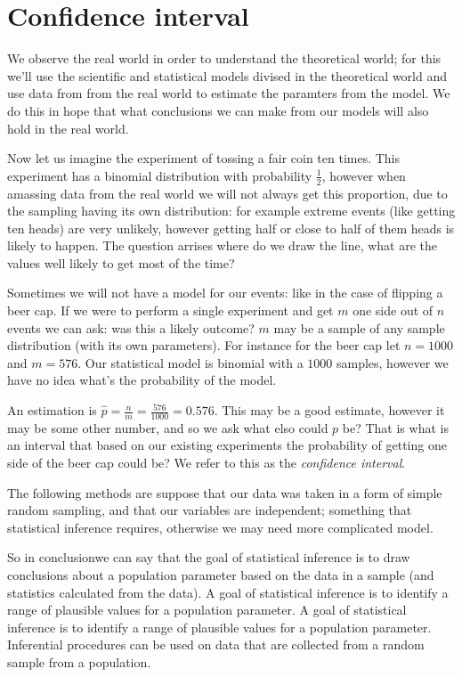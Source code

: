 \chapter*{Confidence interval}

\setcounter{section}{0}
\renewcommand*{\theHsection}{ch4.\the\value{section}}

We observe the real world in order to understand the theoretical world; for this
we'll use the scientific and statistical models divised in the theoretical world
and use data from from the real world to estimate the paramters from the model.
We do this in hope that what conclusions we can make from our models will also
hold in the real world.


Now let us imagine the experiment of tossing a fair coin ten times. This
experiment has a binomial distribution with probability $\frac{1}{2}$, however
when amassing data from the real world we will not always get this proportion,
due to the sampling having its own distribution: for example extreme events
(like getting ten heads) are very unlikely, however getting half or close to
half of them heads is likely to happen. The question arrises where do we draw
the line, what are the values well likely to get most of the time?

Sometimes we will not have a model for our events: like in the case of flipping
a beer cap. If we were to perform a single experiment and get $m$ one side
out of $n$ events we can ask: was this a likely outcome? $m$ may be a sample of
any sample distribution (with its own parameters). For instance for the beer cap
let $n=1000$ and $m=576$. Our statistical model is binomial with a $1000$
samples, however we have no idea what's the probability of the model.

An estimation is $\hat{p}=\frac{n}{m}=\frac{576}{1000}=0.576$. This may be a
good estimate, however it may be some other number, and so we ask what elso
could $p$ be? That is what is an interval that based on our existing experiments
the probability of getting one side of the beer cap could be? We refer to this
as the \emph{confidence interval}.

The following methods are suppose that our data was taken in a form of simple
random sampling, and that our variables are independent; something that
statistical inference requires, otherwise we may need more complicated model.

So in conclusionwe can say that the goal of statistical inference is to draw
conclusions about a population parameter based on the data in a sample (and
statistics calculated from the data). A goal of statistical inference is to
identify a range of plausible values for a population parameter. A goal of
statistical inference is to identify a range of plausible values for a
population parameter. Inferential procedures can be used on data that are
collected from a random sample from a population.


